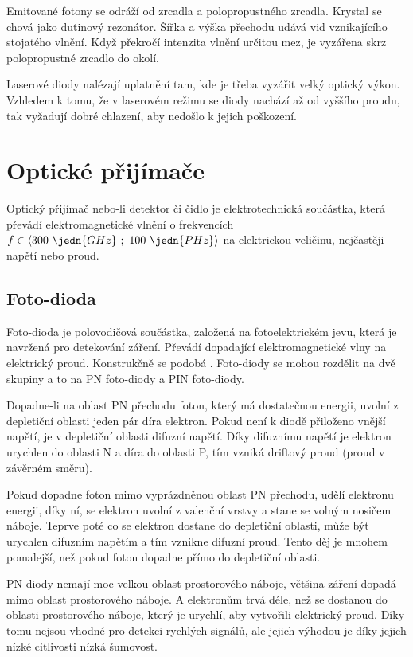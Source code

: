Emitované fotony se odráží od zrcadla a polopropustného zrcadla.  Krystal se chová jako dutinový rezonátor. Šířka a výška přechodu udává vid vznikajícího stojatého vlnění. Když překročí intenzita vlnění určitou mez, je vyzářena skrz polopropustné zrcadlo do okolí.

Laserové diody nalézají uplatnění tam, kde je třeba vyzářit velký optický výkon. Vzhledem k tomu, že v laserovém režimu se diody nachází až od vyššího proudu, tak vyžadují dobré chlazení, aby nedošlo k jejich poškození.

\section{Optické přijímače}
Optický přijímač nebo-li detektor či čidlo je elektrotechnická součástka, která převádí elektromagnetické vlnění o frekvencích $f \in \langle 300~\jedn{GHz}~;~100~\jedn{PHz} \rangle$ na elektrickou veličinu, nejčastěji napětí nebo proud.

\subsection{Foto-dioda}
Foto-dioda je polovodičová součástka, založená na fotoelektrickém jevu, která je navržená pro detekování záření. Převádí dopadající elektromagnetické vlny na elektrický proud. Konstrukčně se podobá . Foto-diody se
mohou rozdělit na dvě skupiny a to na PN foto-diody a PIN foto-diody.

Dopadne-li na oblast PN přechodu foton, který má dostatečnou energii, uvolní z depletiční oblasti jeden pár díra elektron. Pokud není k diodě přiloženo vnější napětí, je v depletiční oblasti difuzní napětí. Díky difuznímu napětí je elektron urychlen do oblasti N a díra do oblasti P, tím vzniká driftový proud (proud v závěrném směru).

Pokud dopadne foton mimo vyprázdněnou oblast PN přechodu, udělí elektronu energii, díky ní, se elektron uvolní z valenční vrstvy a stane se volným nosičem náboje. Teprve poté co se elektron dostane do depletiční oblasti, může být urychlen difuzním napětím a tím vznikne difuzní proud. Tento děj je mnohem pomalejší, než pokud foton dopadne přímo do depletiční oblasti.

PN diody nemají moc velkou oblast prostorového náboje, většina záření dopadá mimo oblast prostorového náboje. A elektronům trvá déle, než se dostanou do oblasti prostorového náboje, který je urychlí, aby vytvořili elektrický proud. Díky tomu nejsou vhodné pro detekci rychlých signálů, ale jejich výhodou je díky jejich nízké citlivosti nízká šumovost.

